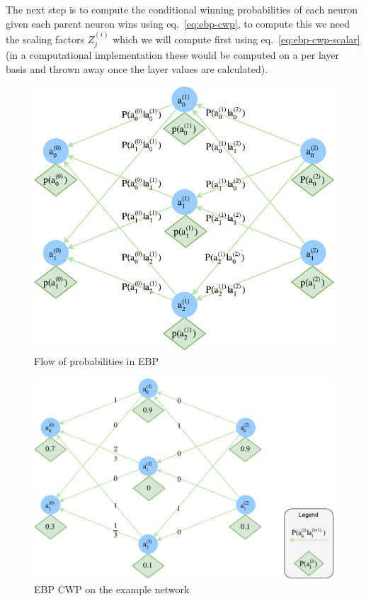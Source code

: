 \documentclass[A4paper,draft]{scrreprt}
\newcommand{\ebpscalar}[2]{Z_{#2}^{(#1)}}
\begin{document}
The next step is to compute the conditional winning probabilities of
each neuron given each parent neuron wins using eq.~\ref{eq:ebp-cwp}, to
compute this we need the scaling factors \(\ebpscalar{i}{j}\) which we
will compute first using eq.~\ref{eq:ebp-cwp-scalar} (in a computational
implementation these would be computed on a per layer basis and thrown
away once the layer values are calculated).

\begin{figure}
\centering
\includegraphics{media/images/ebp-example-mwp.pdf}
\caption{Flow of probabilities in EBP}
\end{figure}

\begin{figure}
\centering
\includegraphics{media/images/ebp-example-mwp-concrete.pdf}
\caption{EBP CWP on the example network}
\end{figure}
\end{document}
